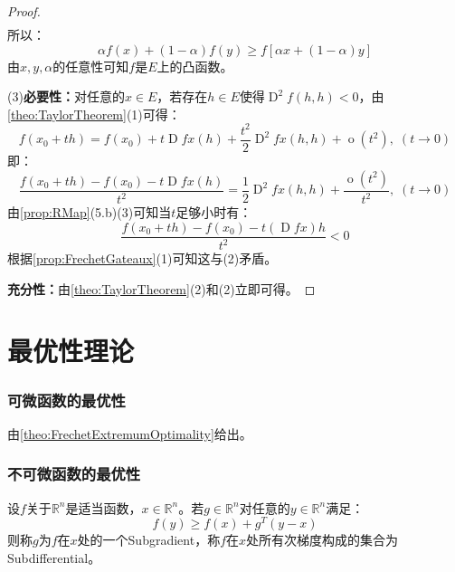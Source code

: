 \begin{proof}
\begin{align*}
	\end{align*}
	所以：
	\begin{equation*}
		\alpha f(x)+(1-\alpha)f(y)\geqslant f[\alpha x+(1-\alpha)y]
	\end{equation*}
	由$x,y,\alpha$的任意性可知$f$是$E$上的凸函数。\par
	(3)\textbf{必要性：}对任意的$x\in E$，若存在$h\in E$使得$\operatorname{D}^2f(h,h)<0$，由\cref{theo:TaylorTheorem}(1)可得：
	\begin{equation*}
		f(x_0+th)=f(x_0)+t\operatorname{D}fx(h)+\frac{t^2}{2}\operatorname{D}^2fx(h,h)+\operatorname{o}(t^2),\;(t\to0)
	\end{equation*}
	即：
	\begin{equation*}
		\frac{f(x_0+th)-f(x_0)-t\operatorname{D}fx(h)}{t^2}=\frac{1}{2}\operatorname{D}^2fx(h,h)+\frac{\operatorname{o}(t^2)}{t^2},\;(t\to0)
	\end{equation*}
	由\cref{prop:RMap}(5.b)(3)可知当$t$足够小时有：
	\begin{equation*}
		\frac{f(x_0+th)-f(x_0)-t(\operatorname{D}fx)h}{t^2}<0
	\end{equation*}
	根据\cref{prop:FrechetGateaux}(1)可知这与(2)矛盾。\par
	\textbf{充分性：}由\cref{theo:TaylorTheorem}(2)和(2)立即可得。
\end{proof}

\section{最优性理论}
\subsubsection{可微函数的最优性}
由\cref{theo:FrechetExtremumOptimality}给出。
\subsubsection{不可微函数的最优性}
\begin{definition}
	设$f$关于$\mathbb{R}^{n}$是适当函数，$x\in\mathbb{R}^{n}$。若$g\in\mathbb{R}^{n}$对任意的$y\in\mathbb{R}^{n}$满足：
	\begin{equation*}
		f(y)\geqslant f(x)+g^T(y-x)
	\end{equation*}
	则称$g$为$f$在$x$处的一个\gls{Subgradient}，称$f$在$x$处所有次梯度构成的集合为\gls{Subdifferential}。
\end{definition}
